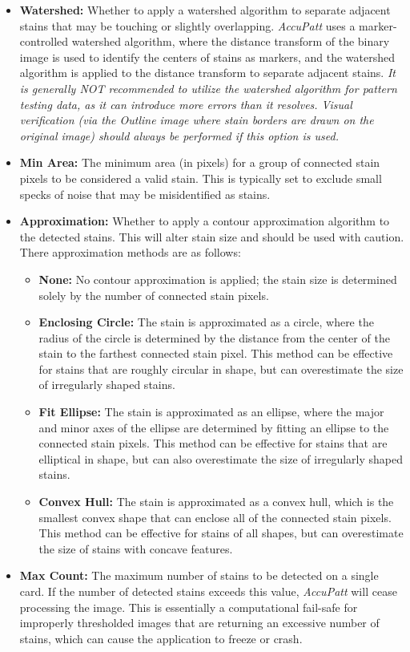 \documentclass[10pt,letterpaper,titlepage]{article}
\begin{document}
    \begin{itemize}
        \item \textbf{Watershed:} Whether to apply a watershed algorithm to separate adjacent stains that may be touching or slightly overlapping. \textit{AccuPatt} uses a marker-controlled watershed algorithm, where the distance transform of the binary image is used to identify the centers of stains as markers, and the watershed algorithm is applied to the distance transform to separate adjacent stains. \textit{It is generally NOT recommended to utilize the watershed algorithm for pattern testing data, as it can introduce more errors than it resolves. Visual verification (via the Outline image where stain borders are drawn on the original image) should always be performed if this option is used.}
        \item \textbf{Min Area:} The minimum area (in pixels) for a group of connected stain pixels to be considered a valid stain. This is typically set to exclude small specks of noise that may be misidentified as stains.
        \item \textbf{Approximation:} Whether to apply a contour approximation algorithm to the detected stains. This will alter stain size and should be used with caution. There approximation methods are as follows:
        \begin{itemize}
            \item \textbf{None:} No contour approximation is applied; the stain size is determined solely by the number of connected stain pixels.
            \item \textbf{Enclosing Circle:} The stain is approximated as a circle, where the radius of the circle is determined by the distance from the center of the stain to the farthest connected stain pixel. This method can be effective for stains that are roughly circular in shape, but can overestimate the size of irregularly shaped stains.
            \item \textbf{Fit Ellipse:} The stain is approximated as an ellipse, where the major and minor axes of the ellipse are determined by fitting an ellipse to the connected stain pixels. This method can be effective for stains that are elliptical in shape, but can also overestimate the size of irregularly shaped stains.
            \item \textbf{Convex Hull:} The stain is approximated as a convex hull, which is the smallest convex shape that can enclose all of the connected stain pixels. This method can be effective for stains of all shapes, but can overestimate the size of stains with concave features.
        \end{itemize}
        \item \textbf{Max Count:} The maximum number of stains to be detected on a single card. If the number of detected stains exceeds this value, \textit{AccuPatt} will cease processing the image. This is essentially a computational fail-safe for improperly thresholded images that are returning an excessive number of stains, which can cause the application to freeze or crash.
    \end{itemize}
\end{document}
